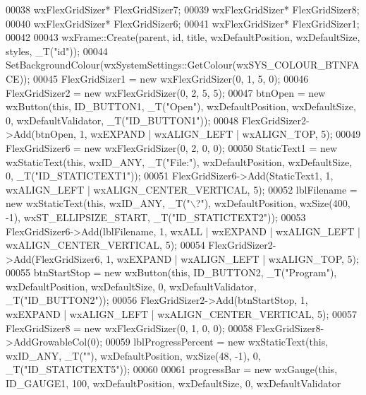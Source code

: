 \begin{DoxyCode}
00038     wxFlexGridSizer* FlexGridSizer7;
00039     wxFlexGridSizer* FlexGridSizer8;
00040     wxFlexGridSizer* FlexGridSizer6;
00041     wxFlexGridSizer* FlexGridSizer1;
00042 
00043     wxFrame::Create(parent, \textcolor{keywordtype}{id}, title, wxDefaultPosition, wxDefaultSize, styles, 
      _T(\textcolor{stringliteral}{"id"}));
00044     SetBackgroundColour(wxSystemSettings::GetColour(wxSYS\_COLOUR\_BTNFACE));
00045     FlexGridSizer1 = \textcolor{keyword}{new} wxFlexGridSizer(0, 1, 5, 0);
00046     FlexGridSizer2 = \textcolor{keyword}{new} wxFlexGridSizer(0, 2, 5, 5);
00047     btnOpen = \textcolor{keyword}{new} wxButton(\textcolor{keyword}{this}, ID\_BUTTON1, _T(\textcolor{stringliteral}{"Open"}), wxDefaultPosition, wxDefaultSize, 0, 
      wxDefaultValidator, _T(\textcolor{stringliteral}{"ID\_BUTTON1"}));
00048     FlexGridSizer2->Add(btnOpen, 1, wxEXPAND | wxALIGN\_LEFT | wxALIGN\_TOP, 5);
00049     FlexGridSizer6 = \textcolor{keyword}{new} wxFlexGridSizer(0, 2, 0, 0);
00050     StaticText1 = \textcolor{keyword}{new} wxStaticText(\textcolor{keyword}{this}, wxID\_ANY, _T(\textcolor{stringliteral}{"File:"}), wxDefaultPosition, wxDefaultSize, 0, 
      _T(\textcolor{stringliteral}{"ID\_STATICTEXT1"}));
00051     FlexGridSizer6->Add(StaticText1, 1, wxALIGN\_LEFT | wxALIGN\_CENTER\_VERTICAL, 5);
00052     lblFilename = \textcolor{keyword}{new} wxStaticText(\textcolor{keyword}{this}, wxID\_ANY, _T(\textcolor{stringliteral}{"\(\backslash\)?"}), wxDefaultPosition, wxSize(400, -1), 
      wxST\_ELLIPSIZE\_START, _T(\textcolor{stringliteral}{"ID\_STATICTEXT2"}));
00053     FlexGridSizer6->Add(lblFilename, 1, wxALL | wxEXPAND | wxALIGN\_LEFT | wxALIGN\_CENTER\_VERTICAL, 5);
00054     FlexGridSizer2->Add(FlexGridSizer6, 1, wxEXPAND | wxALIGN\_LEFT | wxALIGN\_TOP, 5);
00055     btnStartStop = \textcolor{keyword}{new} wxButton(\textcolor{keyword}{this}, ID\_BUTTON2, _T(\textcolor{stringliteral}{"Program"}), wxDefaultPosition, wxDefaultSize, 0, 
      wxDefaultValidator, _T(\textcolor{stringliteral}{"ID\_BUTTON2"}));
00056     FlexGridSizer2->Add(btnStartStop, 1, wxEXPAND | wxALIGN\_LEFT | wxALIGN\_CENTER\_VERTICAL, 5);
00057     FlexGridSizer8 = \textcolor{keyword}{new} wxFlexGridSizer(0, 1, 0, 0);
00058     FlexGridSizer8->AddGrowableCol(0);
00059     lblProgressPercent = \textcolor{keyword}{new} wxStaticText(\textcolor{keyword}{this}, wxID\_ANY, _T(\textcolor{stringliteral}{""}), wxDefaultPosition, wxSize(48, -1), 0, 
      _T(\textcolor{stringliteral}{"ID\_STATICTEXT5"}));
00060 
00061     progressBar = \textcolor{keyword}{new} wxGauge(\textcolor{keyword}{this}, ID\_GAUGE1, 100, wxDefaultPosition, wxDefaultSize, 0, wxDefaultValidator

\end{DoxyCode}
